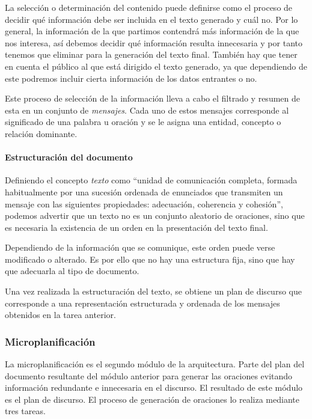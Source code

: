 La selección o determinación del contenido puede definirse como el proceso de decidir qué información debe ser incluida en el texto generado y cuál no. Por lo general, la información de la que partimos contendrá más información de la que nos interesa, así debemos decidir qué información resulta innecesaria y por tanto tenemos que eliminar para la generación del texto final. También hay que tener en cuenta el público al que está dirigido el texto generado, ya que dependiendo de este podremos incluir cierta información de los datos entrantes o no.

Este proceso de selección de la información lleva a cabo el filtrado y resumen de esta en un conjunto de \textit{mensajes}. Cada uno de estos mensajes corresponde al significado de una palabra u oración y se le asigna una entidad, concepto o relación dominante.

\paragraph{Estructuración del documento}\hfill

Definiendo el concepto \textit{texto} como ``unidad de comunicación completa, formada habitualmente por una sucesión ordenada de enunciados que transmiten un mensaje con las siguientes propiedades: adecuación, coherencia y cohesión'', podemos advertir que un texto no es un conjunto aleatorio de oraciones, sino que es necesaria la existencia de un orden en la presentación del texto final.

Dependiendo de la información que se comunique, este orden puede verse modificado o alterado. Es por ello que no hay una estructura fija, sino que hay que adecuarla al tipo de documento.

Una vez realizada la estructuración del texto, se obtiene un plan de discurso que corresponde a una representación estructurada y ordenada de los mensajes obtenidos en la tarea anterior.

\subsubsection{Microplanificación}
La microplanificación es el segundo módulo de la arquitectura. Parte del plan del documento resultante del módulo anterior para generar las oraciones evitando información redundante e innecesaria en el discurso. El resultado de este módulo es el plan de discurso. El proceso de generación de oraciones lo realiza mediante tres tareas.

